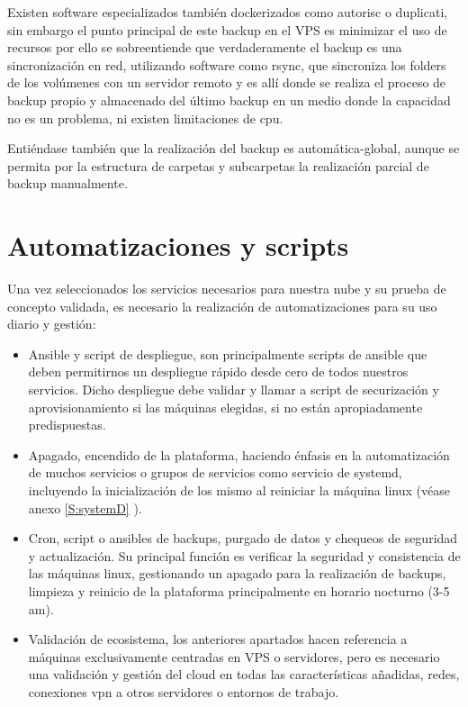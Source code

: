 Existen software especializados también dockerizados como autorisc\cite{c_autorisc} o duplicati\cite{c_duplicati}, sin embargo el punto principal de este backup en el VPS es minimizar el uso de recursos por ello se sobreentiende que verdaderamente el backup es una sincronización en red, utilizando software como rsync\cite{c_rsync}, que sincroniza los folders de los volúmenes con un servidor remoto y es allí donde se realiza el proceso de backup propio y almacenado del último backup en un medio donde la capacidad no es un problema, ni existen limitaciones de cpu.

Entiéndase también que la realización del backup es automática-global, aunque se permita por la estructura de carpetas y subcarpetas la realización parcial de backup manualmente. 

\section{Automatizaciones y scripts}
Una vez seleccionados los servicios necesarios para nuestra nube y su prueba de concepto validada, es necesario la realización de automatizaciones para su uso diario y gestión:
\begin{itemize}
    \item Ansible y script de despliegue, son principalmente scripts de ansible que deben permitirnos un despliegue rápido desde cero de todos nuestros servicios. Dicho despliegue debe validar y llamar a script de securización y aprovisionamiento si las máquinas elegidas, si no están apropiadamente predispuestas.
    \item Apagado, encendido de la plataforma, haciendo énfasis en la automatización de muchos servicios o grupos de servicios como servicio de systemd\cite{c_systemd}, incluyendo la inicialización de los mismo al reiniciar la máquina linux  (véase anexo \ref{S:systemD} ).
    \item Cron, script o ansibles de backups, purgado de datos y chequeos de seguridad y actualización. Su principal función es verificar la seguridad y consistencia de las máquinas linux, gestionando un apagado para la realización de backups, limpieza y reinicio de la plataforma principalmente en horario nocturno (3-5 am).
    \item Validación de ecosistema, los anteriores apartados hacen referencia a máquinas exclusivamente centradas en VPS o servidores, pero es necesario una validación y gestión del cloud en todas las características añadidas, redes, conexiones vpn a otros servidores o entornos de trabajo.
\end{itemize}

